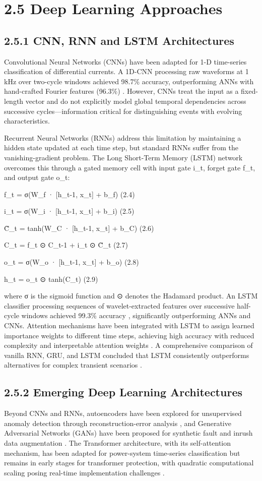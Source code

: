 \section{2.5  Deep Learning Approaches}

\subsection{2.5.1  CNN, RNN and LSTM Architectures}
Convolutional Neural Networks (CNNs) have been adapted for 1-D time-series classification of differential currents. A 1D-CNN processing raw waveforms at 1 kHz over two-cycle windows achieved 98.7\% accuracy, outperforming ANNs with hand-crafted Fourier features (96.3\%) \cite{ref16}. However, CNNs treat the input as a fixed-length vector and do not explicitly model global temporal dependencies across successive cycles---information critical for distinguishing events with evolving characteristics.

Recurrent Neural Networks (RNNs) address this limitation by maintaining a hidden state updated at each time step, but standard RNNs suffer from the vanishing-gradient problem. The Long Short-Term Memory (LSTM) network overcomes this through a gated memory cell with input gate i\_t, forget gate f\_t, and output gate o\_t:

f\_t = σ(W\_f · [h\_{t-1}, x\_t] + b\_f)	(2.4)

i\_t = σ(W\_i · [h\_{t-1}, x\_t] + b\_i)	(2.5)

C̃\_t = tanh(W\_C · [h\_{t-1}, x\_t] + b\_C)	(2.6)

C\_t = f\_t ⊙ C\_{t-1} + i\_t ⊙ C̃\_t	(2.7)

o\_t = σ(W\_o · [h\_{t-1}, x\_t] + b\_o)	(2.8)

h\_t = o\_t ⊙ tanh(C\_t)	(2.9)

where σ is the sigmoid function and ⊙ denotes the Hadamard product. An LSTM classifier processing sequences of wavelet-extracted features over successive half-cycle windows achieved 99.3\% accuracy \cite{ref1}, significantly outperforming ANNs and CNNs. Attention mechanisms have been integrated with LSTM to assign learned importance weights to different time steps, achieving high accuracy with reduced complexity and interpretable attention weights \cite{ref3}. A comprehensive comparison of vanilla RNN, GRU, and LSTM concluded that LSTM consistently outperforms alternatives for complex transient scenarios \cite{ref23}.


\subsection{2.5.2  Emerging Deep Learning Architectures}
Beyond CNNs and RNNs, autoencoders have been explored for unsupervised anomaly detection through reconstruction-error analysis \cite{ref35}, and Generative Adversarial Networks (GANs) have been proposed for synthetic fault and inrush data augmentation \cite{ref36}. The Transformer architecture, with its self-attention mechanism, has been adapted for power-system time-series classification but remains in early stages for transformer protection, with quadratic computational scaling posing real-time implementation challenges \cite{ref37}.


